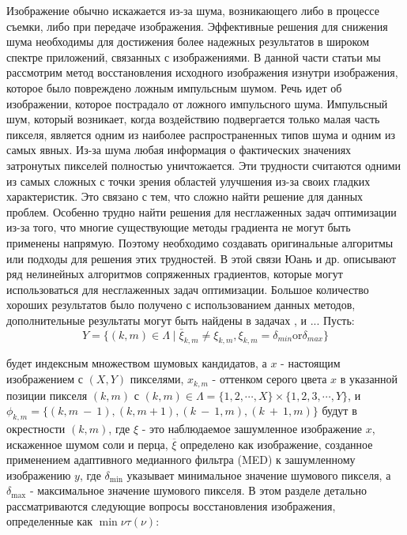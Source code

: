 Изображение обычно искажается из-за шума, возникающего либо в процессе съемки,
либо при передаче изображения. Эффективные решения для снижения шума необходимы
для достижения более надежных результатов в широком спектре приложений,
связанных с изображениями. В данной части статьи мы рассмотрим метод
восстановления исходного изображения изнутри изображения, которое было
повреждено ложным импульсным шумом. Речь идет об изображении, которое пострадало
от ложного импульсного шума. Импульсный шум, который возникает, когда
воздействию подвергается только малая часть пикселя, является одним из наиболее
распространенных типов шума и одним из самых явных. Из-за шума любая информация
о фактических значениях затронутых пикселей полностью уничтожается. Эти
трудности считаются одними из самых сложных с точки зрения областей улучшения
из-за своих гладких характеристик. Это связано с тем, что сложно найти решение
для данных проблем. Особенно трудно найти решения для несглаженных задач
оптимизации из-за того, что многие существующие методы градиента не могут быть
применены напрямую. Поэтому необходимо создавать оригинальные алгоритмы или
подходы для решения этих трудностей. В этой связи Юань и др.
\cite{art18,art19,art20,art21} описывают ряд нелинейных алгоритмов сопряженных
градиентов, которые могут использоваться для несглаженных задач оптимизации.
Большое количество хороших результатов было получено с использованием данных
методов, дополнительные результаты могут быть найдены в задачах
\cite{art22,art23,art24,art25,art26}, и ... Пусть:
\begin{equation*}
    Y=\{(k,m)\in\Lambda\mid\bar{\xi}_{k,m}\neq\xi_{k,m},\xi_{k,m}=\delta_{m i n} \text{or} \delta_{m a x}\}
\end{equation*}

будет индексным множеством шумовых кандидатов, а $x$ - настоящим изображением с
$\left( X, Y \right)$ пикселями, $x_{k,m}$ - оттенком серого цвета $x$ в
указанной позиции пикселя $\left( k, m \right)$ с
$(k,m)\in\Lambda=\{1,2,\cdots,X\}\times\{1,2,3,\cdots,Y\}$, и $\phi_{k,m}
= \{(k,m\:-\:1),(k,m+1),(k\:-\:1,m),(k\:+\:1,m)\}$ будут в окрестности $\left(k,
m \right)$, где $\xi$ - это наблюдаемое зашумленное изображение $x$, искаженное
шумом соли и перца, $\overline{{\xi}}$ определено как изображение, созданное
применением адаптивного медианного фильтра (MED) к зашумленному изображению $y$,
где $\delta_{\min}$ указывает минимальное значение шумового пикселя, а $\delta_{\max}$ -
максимальное значение шумового пикселя. В этом разделе детально рассматриваются
следующие вопросы восстановления изображения, определенные как 
$\min\limits{\nu}\tau \left( \nu \right)$:

